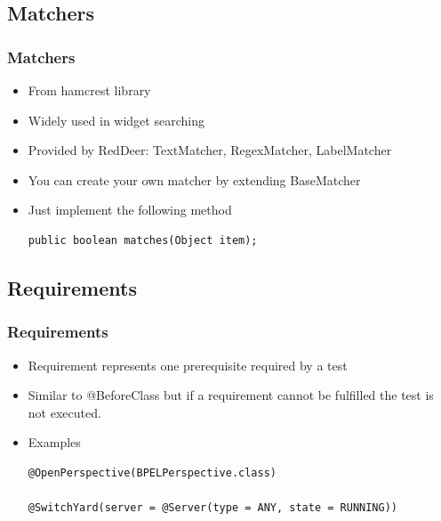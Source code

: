 \documentclass{beamer}
\begin{document}
\subsection{Matchers}
\begin{frame}[fragile]
\frametitle{Matchers}
\begin{itemize}
\item From hamcrest library
\item Widely used in widget searching
\item Provided by RedDeer: TextMatcher, RegexMatcher, LabelMatcher
\item You can create your own matcher by extending BaseMatcher
\item Just implement the following method
\begin{lstlisting}
public boolean matches(Object item);
\end{lstlisting}
\end{itemize}
\end{frame}

\subsection{Requirements}
\begin{frame}[fragile]
\frametitle{Requirements}
\begin{itemize}
\item Requirement represents one prerequisite required by a test
\item Similar to @BeforeClass but if a requirement cannot be fulfilled the test is not executed.
\item Examples
\begin{lstlisting}
@OpenPerspective(BPELPerspective.class)

@SwitchYard(server = @Server(type = ANY, state = RUNNING))
\end{lstlisting}
\end{itemize}
\end{frame}
\end{document}
